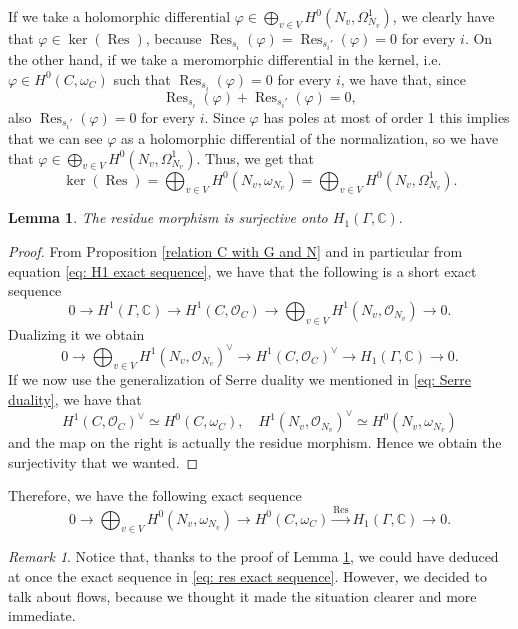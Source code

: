 \documentclass[a4paper,12 pt,titlepage,twoside]{book}
\newcommand{\numberset}{\mathbb}
\newcommand{\C}{\numberset{C}}
\newcommand{\os}{\mathcal{O}}
\DeclareMathOperator{\res}{Res}
\theoremstyle{plain}
\theoremstyle{theorem}
\newtheorem{lemma}[thm]{Lemma}
\theoremstyle{definition}
\theoremstyle{remark}
\newtheorem{oss}[thm]{Remark}
\begin{document}
	If we take a holomorphic differential $\varphi \in \bigoplus_{v \in V} H^0(N_v, \Omega^1_{N_v})$, we clearly have that $\varphi \in \ker(\res)$, because $\res_{s_i}(\varphi) = \res_{s_i'}(\varphi) = 0$ for every $i$. On the other hand, if we take a meromorphic differential in the kernel, i.e. $\varphi \in H^0(C, \omega_C)$ such that $\res_{s_i}(\varphi)=0$ for every $i$, we have that, since $$\res_{s_i}(\varphi) + \res_{s_i'}(\varphi)=0,$$ also $\res_{s_i'}(\varphi)=0$ for every $i$. Since $\varphi$ has poles at most of order 1 this implies that we can see $\varphi$ as a holomorphic differential of the normalization, so we have that $\varphi \in \bigoplus_{v \in V} H^0(N_v, \Omega^1_{N_v}).$ Thus, we get that $$\ker(\res) = \bigoplus_{v \in V} H^0(N_v, \omega_{N_v}) = \bigoplus_{v \in V} H^0(N_v, \Omega^1_{N_v}).$$ 
	\begin{lemma}\label{lem: res surjective}
		The residue morphism is surjective onto $H_1(\Gamma,\C).$
	\end{lemma}
	\begin{proof}
		From Proposition \ref{relation C with G and N} and in particular from equation \eqref{eq: H1 exact sequence}, we have that the following is a short exact sequence $$0 \rightarrow H^1(\Gamma, \C) \rightarrow H^1(C,\os_C) \rightarrow \bigoplus_{v \in V} H^1(N_v, \os_{N_v}) \rightarrow 0.$$ Dualizing it we obtain $$0 \rightarrow \bigoplus_{v \in V}H^1(N_v, \os_{N_v})^\vee \rightarrow H^1(C, \os_C)^\vee \rightarrow H_1(\Gamma, \C) \rightarrow 0.$$ If we now use the generalization of Serre duality we mentioned in \eqref{eq: Serre duality}, we have that $$H^1(C, \os_C)^\vee \simeq H^0(C, \omega_C), \quad H^1(N_v, \os_{N_v})^\vee \simeq H^0(N_v, \omega_{N_v})$$ and the map on the right is actually the residue morphism. Hence we obtain the surjectivity that we wanted.
	\end{proof}
	Therefore, we have the following exact sequence \begin{equation}\label{eq: res exact sequence} 0 \rightarrow \bigoplus_{v \in V} H^0(N_v,\omega_{N_v}) \rightarrow H^0(C,\omega_C) \stackrel{\res}{\longrightarrow} H_1(\Gamma,\C) \rightarrow 0.\end{equation} 
	\begin{oss}
		Notice that, thanks to the proof of Lemma \ref{lem: res surjective}, we could have deduced at once the exact sequence in \eqref{eq: res exact sequence}. However, we decided to talk about flows, because we thought it made the situation clearer and more immediate.
	\end{oss}
\end{document}
